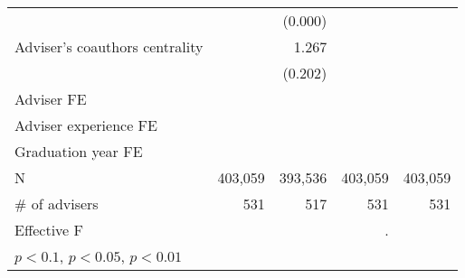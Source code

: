 {\begin{tabular}{l*{4}{D{.}{.}{-1}}}
                              	&                        	&        (0.000)         	&                        	&                        \\
\addlinespace
Adviser's coauthors centrality	&                        	&          1.267\sym{***}	&                        	&                        \\
                              	&                        	&        (0.202)         	&                        	&                        \\
\addlinespace
Adviser FE                    	&     \checkmark         	&     \checkmark         	&     \checkmark         	&     \checkmark         \\
\addlinespace
Adviser experience FE         	&     \checkmark         	&     \checkmark         	&     \checkmark         	&     \checkmark         \\
\addlinespace
Graduation year FE            	&     \checkmark         	&     \checkmark         	&     \checkmark         	&     \checkmark         \\
\midrule
N                             	&        403,059         	&        393,536         	&        403,059         	&        403,059         \\
\# of advisers                	&            531         	&            517         	&            531         	&            531         \\
Effective F                   	&                        	&                        	&              .         	&                        \\
\bottomrule
{}\\
\end{tabular}
}
